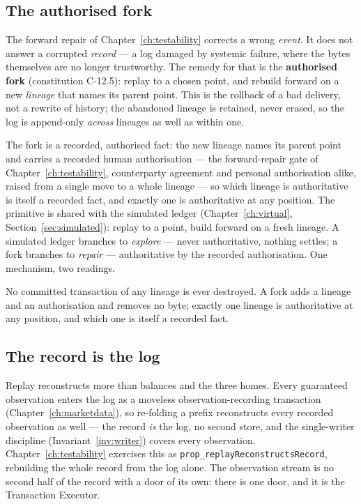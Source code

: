 \subsection{The authorised fork}

The forward repair of Chapter~\ref{ch:testability} corrects a wrong \emph{event}. It does not
answer a corrupted \emph{record} --- a log damaged by systemic failure, where the bytes
themselves are no longer trustworthy. The remedy for that is the \textbf{authorised fork}
(constitution C-12.5): replay to a chosen point, and rebuild forward on a new \emph{lineage}
that names its parent point. This is the rollback of a bad delivery, not a rewrite of history;
the abandoned lineage is retained, never erased, so the log is append-only \emph{across}
lineages as well as within one.

The fork is a recorded, authorised fact: the new lineage names its parent point and carries
a recorded human authorisation --- the forward-repair gate of Chapter~\ref{ch:testability},
counterparty agreement and personal authorisation alike, raised
from a single move to a whole lineage --- so which lineage is authoritative is itself a
recorded fact, and exactly one is authoritative at any position. The primitive is shared
with the simulated ledger (Chapter~\ref{ch:virtual}, Section~\ref{sec:simulated}): replay
to a point, build forward on a fresh lineage. A simulated ledger branches to \emph{explore}
--- never authoritative, nothing settles; a fork branches to \emph{repair} --- authoritative
by the recorded authorisation. One mechanism, two readings.

\begin{invariant}\label{inv:lineage}
No committed transaction of any lineage is ever destroyed. A fork adds a lineage and an
authorisation and removes no byte; exactly one lineage is authoritative at any position, and
which one is itself a recorded fact.
\end{invariant}

\subsection{The record is the log}\label{sec:record-is-log}

Replay reconstructs more than balances and the three homes. Every guaranteed observation
enters the log as a moveless observation-recording transaction
(Chapter~\ref{ch:marketdata}), so re-folding a prefix reconstructs every recorded
observation as well --- the record \emph{is} the log, no second store, and the
single-writer discipline (Invariant~\ref{inv:writer}) covers every observation.
Chapter~\ref{ch:testability} exercises this as
\texttt{prop\_replayReconstructsRecord}, rebuilding the whole record from the log alone.
The observation stream is no second half of the record with a door of its own: there is
one door, and it is the Transaction Executor.

